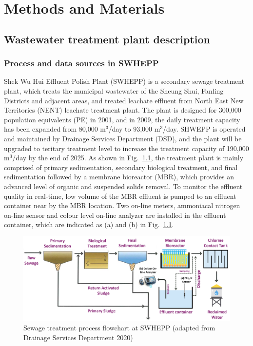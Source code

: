 \chapter{Methods and Materials}
\section{Wastewater treatment plant description}
\subsection{Process and data sources in SWHEPP}
Shek Wu Hui Effluent Polish Plant (SWHEPP) is a secondary sewage treatment plant, which treats the municipal wastewater of the Sheung Shui, Fanling Districts and adjacent areas, and treated leachate effluent from North East New Territories (NENT) leachate treatment plant. The plant is designed for 300,000 population equivalents (PE) in 2001, and in 2009, the daily treatment capacity has been expanded from 80,000 m$^3$/day to 93,000 m$^3$/day. SHWEPP is operated and maintained by Drainage Services Department (DSD), and the plant will be upgraded to teritary treatment level to increase the treatment capacity of 190,000 m$^3$/day by the end of 2025. As shown in Fig.~\ref{fig:SHWEPP-flowchart}, the treatment plant is mainly comprised of primary sedimentation, secondary biological treatment, and final sedimentation followed by a membrane bioreactor (MBR), which provides an advanced level of organic and suspended solids removal. To monitor the effluent quality in real-time, low volume of the MBR effluent is pumped to an effluent container near by the MBR location. Two on-line meters, ammoniacal nitrogen on-line sensor and colour level on-line analyzer are installed in the effluent container, which are indicated as (a) and (b) in Fig.~\ref{fig:SHWEPP-flowchart}.

\begin{figure}[h]
    \centering
    \includegraphics[width=0.9\columnwidth]{imgs/Sewage-treatment-process-flowchart.png}
    \caption{Sewage treatment process flowchart at SWHEPP (adapted from Drainage Services Department 2020)}
    \label{fig:SHWEPP-flowchart}
\end{figure}

